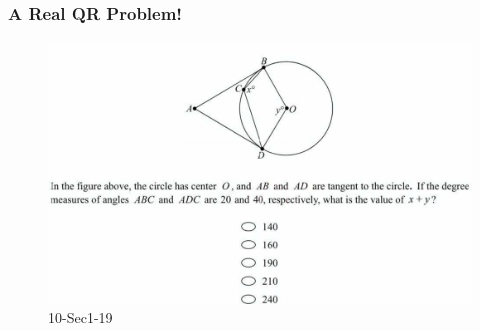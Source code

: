 \documentclass[
	11pt, %
]{beamer}
\begin{document}


\begin{frame}
	\frametitle{A Real QR Problem!}
	\framesubtitle{}
	\begin{figure}
		\includegraphics[width=0.8\linewidth]{Chord_Angle_Tangent_Example_Question1.png}
		\caption{10-Sec1-19}
	\end{figure}
\end{frame}

\end{document}
